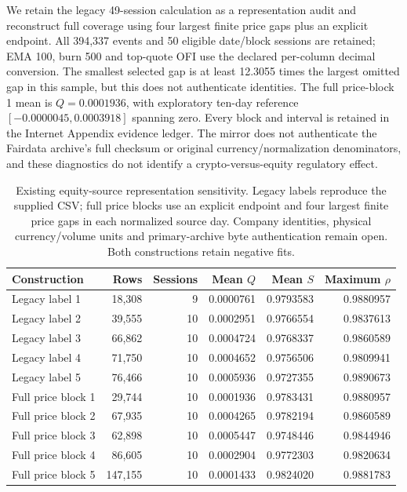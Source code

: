 \documentclass[12pt]{article}
\theoremstyle{definition}
\theoremstyle{remark}
\begin{document}
We retain the legacy 49-session calculation as a representation audit and reconstruct full coverage using four largest finite price gaps plus an explicit endpoint. All 394,337 events and 50 eligible date/block sessions are retained; EMA 100, burn 500 and top-quote OFI use the declared per-column decimal conversion. The smallest selected gap is at least 12.3055 times the largest omitted gap in this sample, but this does not authenticate identities. The full price-block 1 mean is $Q=0.0001936$, with exploratory ten-day reference $[-0.0000045,0.0003918]$ spanning zero. Every block and interval is retained in the Internet Appendix evidence ledger. The mirror does not authenticate the Fairdata archive's full checksum or original currency/normalization denominators, and these diagnostics do not identify a crypto-versus-equity regulatory effect.

\begin{table}[htbp]\centering\small
\caption{Existing equity-source representation sensitivity. Legacy labels reproduce the supplied CSV; full price blocks use an explicit endpoint and four largest finite price gaps in each normalized source day. Company identities, physical currency/volume units and primary-archive byte authentication remain open. Both constructions retain negative fits.}
\label{tab:equity_benchmark}
\begin{tabular}{lrrrrr}\toprule
Construction & Rows & Sessions & Mean $Q$ & Mean $S$ & Maximum $\rho$ \\\midrule
Legacy label 1 & 18,308 & 9 & 0.0000761 & 0.9793583 & 0.9880957 \\
Legacy label 2 & 39,555 & 10 & 0.0002951 & 0.9766554 & 0.9837613 \\
Legacy label 3 & 66,862 & 10 & 0.0004724 & 0.9768337 & 0.9860589 \\
Legacy label 4 & 71,750 & 10 & 0.0004652 & 0.9756506 & 0.9809941 \\
Legacy label 5 & 76,466 & 10 & 0.0005936 & 0.9727355 & 0.9890673 \\
\midrule
Full price block 1 & 29,744 & 10 & 0.0001936 & 0.9783431 & 0.9880957 \\
Full price block 2 & 67,935 & 10 & 0.0004265 & 0.9782194 & 0.9860589 \\
Full price block 3 & 62,898 & 10 & 0.0005447 & 0.9748446 & 0.9844946 \\
Full price block 4 & 86,605 & 10 & 0.0002904 & 0.9772303 & 0.9820634 \\
Full price block 5 & 147,155 & 10 & 0.0001433 & 0.9824020 & 0.9881783 \\
\bottomrule\end{tabular}\end{table}
\end{document}
